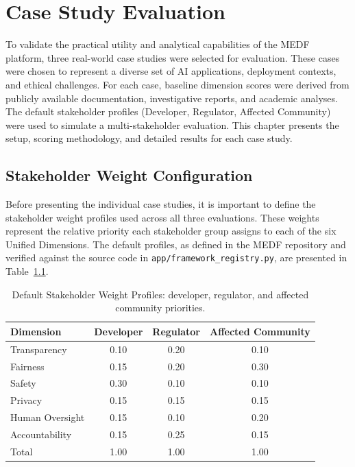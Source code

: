 \chapter{Case Study Evaluation}
\label{ch:case_studies}

To validate the practical utility and analytical capabilities of the MEDF platform, three real-world case studies were selected for evaluation. These cases were chosen to represent a diverse set of AI applications, deployment contexts, and ethical challenges. For each case, baseline dimension scores were derived from publicly available documentation, investigative reports, and academic analyses. The default stakeholder profiles (Developer, Regulator, Affected Community) were used to simulate a multi-stakeholder evaluation. This chapter presents the setup, scoring methodology, and detailed results for each case study.

\section{Stakeholder Weight Configuration}
\label{sec:weights}

Before presenting the individual case studies, it is important to define the stakeholder weight profiles used across all three evaluations. These weights represent the relative priority each stakeholder group assigns to each of the six Unified Dimensions. The default profiles, as defined in the MEDF repository and verified against the source code in \texttt{app/framework\_registry.py}, are presented in Table~\ref{tab:weights}.

\begin{table}[H]
\centering
\caption{Default Stakeholder Weight Profiles: developer, regulator, and affected community priorities.}
\label{tab:weights}
\begin{tabular}{@{}lccc@{}}
\toprule
\textbf{Dimension} & \textbf{Developer} & \textbf{Regulator} & \textbf{Affected Community} \\
\midrule
Transparency       & 0.10 & 0.20 & 0.10 \\
Fairness           & 0.15 & 0.20 & 0.30 \\
Safety             & 0.30 & 0.10 & 0.10 \\
Privacy            & 0.15 & 0.15 & 0.15 \\
Human Oversight    & 0.15 & 0.10 & 0.20 \\
Accountability     & 0.15 & 0.25 & 0.15 \\
\midrule
Total              & 1.00 & 1.00 & 1.00 \\
\bottomrule
\end{tabular}
\end{table}

